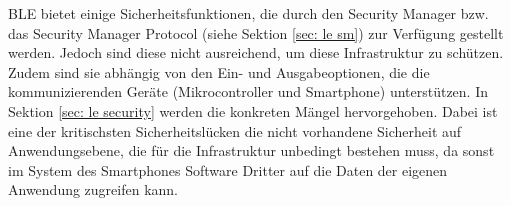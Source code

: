 

BLE bietet einige Sicherheitsfunktionen, die durch den Security Manager bzw. das Security Manager Protocol (siehe Sektion \ref{sec: le sm}) zur Verfügung gestellt werden. Jedoch sind diese nicht ausreichend, um diese Infrastruktur zu schützen. Zudem sind sie abhängig von den Ein- und Ausgabeoptionen, die die kommunizierenden Geräte (Mikrocontroller und Smartphone) unterstützen. In Sektion \ref{sec: le security} werden die konkreten Mängel hervorgehoben. Dabei ist eine der kritischsten Sicherheitslücken die nicht vorhandene Sicherheit auf Anwendungsebene, die für die Infrastruktur unbedingt bestehen muss, da sonst im System des Smartphones Software Dritter auf die Daten der eigenen Anwendung zugreifen kann.
\\\\
